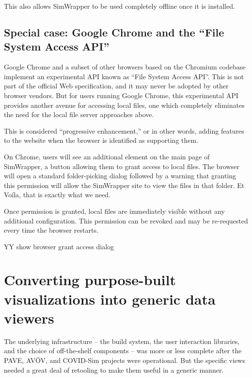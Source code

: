 \documentclass[3p,times,procedia]{elsarticle}
\begin{document}
This also allows SimWrapper to be used completely offline once it
is installed.


\subsection{Special case: Google Chrome and the ``File System Access
API''}

Google Chrome and a subset of other browsers based on the Chromium
codebase implement an experimental API known as ``File System Access
API''. This is not part of the official Web specification, and it may
never be adopted by other browser vendors. But for users running Google Chrome,
this experimental API provides another avenue for accessing local files, one which completely
eliminates the need for the local file server approaches above.

This is considered ``progressive enhancement,'' or in other words,
adding features to the website when the browser is identified as
supporting them.

On Chrome, users will see an additional element on the main page of
SimWrapper, a button allowing them to grant access to local files. The
browser will open a standard folder-picking dialog followed by a warning
that granting this permission will allow the SimWrapper site to view the
files in that folder. Et Voíla, that is exactly what we need.

Once permission is granted, local files are immediately visible without
any additional configuration. This permission can be revoked and may be
re-requested every time the browser restarts.

YY show browser grant access dialog


\section{Converting purpose-built visualizations into generic data viewers}

The underlying infrastructure -- the build system, the user interaction
libraries, and the choice of off-the-shelf components -- was more or
less complete after the PAVE, AVÖV, and COVID-Sim projects were
operational. But the specific views needed a great deal of retooling to
make them useful in a generic manner.
\end{document}
